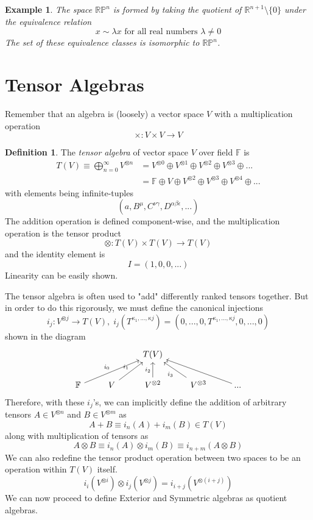 \documentclass{article}
\newtheorem{example}{Example}[section]
\theoremstyle{remark}
\theoremstyle{definition}
\newtheorem{definition}{Definition}[section]
\begin{document}
\begin{example}
The space $\mathbb{RP}^n$ is formed by taking the quotient of $\mathbb{R}^{n+1} \setminus \{0\}$ under the equivalence relation 
\[x \sim \lambda x \text{ for all real numbers } \lambda \neq 0\]
The set of these equivalence classes is isomorphic to $\mathbb{RP}^n$. 
\end{example}

\section{Tensor Algebras}
Remember that an algebra is (loosely) a vector space $V$ with a multiplication operation
\[\times: V \times V \longrightarrow V\]
\begin{definition}
The \textit{tensor algebra} of vector space $V$ over field $\mathbb{F}$ is 
\begin{align*}
    T(V) \equiv \bigoplus_{n = 0}^{\infty} V^{\otimes n} & = V^{\otimes 0} \oplus V^{\otimes 1} \oplus V^{\otimes 2} \oplus V^{\otimes 3} \oplus ... \\
    & = \mathbb{F} \oplus V \oplus V^{\otimes 2} \oplus V^{\otimes 3} \oplus V^{\otimes 4} \oplus ...
\end{align*}
with elements being infinite-tuples
\[ (a, B^\mu, C^{\nu \gamma}, D^{\alpha \beta \epsilon}, ...)\]
The addition operation is defined component-wise, and the multiplication operation is the tensor product 
\[\otimes: T(V) \times T(V) \longrightarrow T(V)\]
and the identity element is
\[I = (1, 0, 0, ...) \]
Linearity can be easily shown. 
\end{definition}

The tensor algebra is often used to "add" differently ranked tensors together. But in order to do this rigorously, we must define the canonical injections
\[i_j: V^{\otimes j} \longrightarrow T(V), \; i_j (T^{\kappa_1, ..., \kappa j}) = (0, ...,0, T^{\kappa_1, ..., \kappa j}, 0, ..., 0) \]
shown in the diagram
\[\begin{tikzcd}
    & & T(V) & & \\
    \mathbb{F} \arrow{urr}{i_0} & V \arrow{ur}{i_1} & V^{\otimes 2} \arrow{u}{i_2} & V^{\otimes 3} \arrow{ul}{i_3} & ... \arrow{ull}
\end{tikzcd}\]
Therefore, with these $i_j$'s, we can implicitly define the addition of arbitrary tensors $A \in V^{\otimes n}$ and $B \in V^{\otimes m}$ as 
\[ A + B \equiv i_n (A) + i_m (B) \in T(V)\]
along with multiplication of tensors as
\[ A \otimes B \equiv i_n(A) \otimes i_m(B) \equiv i_{n+m} (A \otimes B)\]
We can also redefine the tensor product operation between two spaces to be an operation within $T(V)$ itself. 
\[i_i(V^{\otimes i}) \otimes i_j( V^{\otimes j}) = i_{i+j} (V^{\otimes (i+j)})\]
We can now proceed to define Exterior and Symmetric algebras as quotient algebras. 
\end{document}
